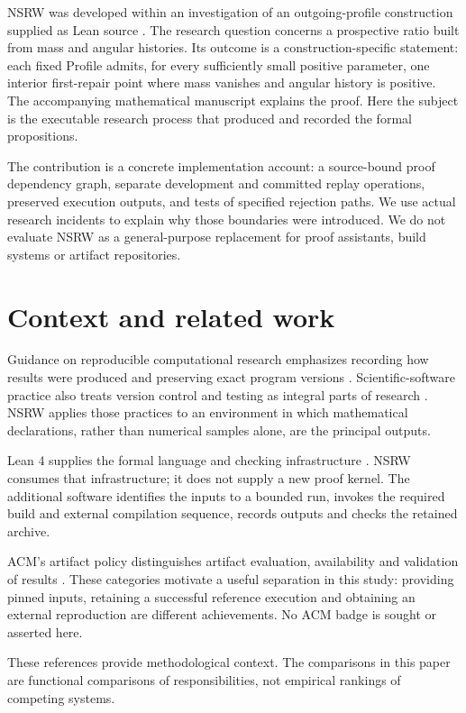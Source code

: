 \documentclass[11pt,a4paper]{article}
\begin{document}
NSRW was developed within an investigation of an outgoing-profile construction supplied as Lean source \cite{ref1}. The research question concerns a prospective ratio built from mass and angular histories. Its outcome is a construction-specific statement: each fixed Profile admits, for every sufficiently small positive parameter, one interior first-repair point where mass vanishes and angular history is positive. The accompanying mathematical manuscript \cite{ref2} explains the proof. Here the subject is the executable research process that produced and recorded the formal propositions.

The contribution is a concrete implementation account: a source-bound proof dependency graph, separate development and committed replay operations, preserved execution outputs, and tests of specified rejection paths. We use actual research incidents to explain why those boundaries were introduced. We do not evaluate NSRW as a general-purpose replacement for proof assistants, build systems or artifact repositories.

\section{Context and related work}

Guidance on reproducible computational research emphasizes recording how results were produced and preserving exact program versions \cite{ref3}. Scientific-software practice also treats version control and testing as integral parts of research \cite{ref4}. NSRW applies those practices to an environment in which mathematical declarations, rather than numerical samples alone, are the principal outputs.

Lean 4 supplies the formal language and checking infrastructure \cite{ref5}. NSRW consumes that infrastructure; it does not supply a new proof kernel. The additional software identifies the inputs to a bounded run, invokes the required build and external compilation sequence, records outputs and checks the retained archive.

ACM's artifact policy distinguishes artifact evaluation, availability and validation of results \cite{ref6}. These categories motivate a useful separation in this study: providing pinned inputs, retaining a successful reference execution and obtaining an external reproduction are different achievements. No ACM badge is sought or asserted here.

These references provide methodological context. The comparisons in this paper are functional comparisons of responsibilities, not empirical rankings of competing systems.
\end{document}
